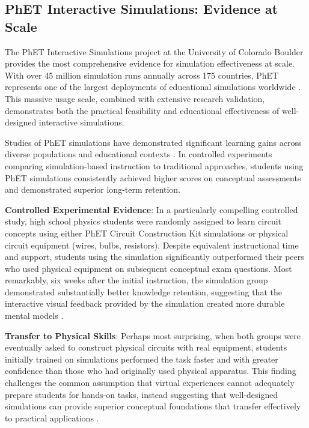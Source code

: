 \subsection{PhET Interactive Simulations: Evidence at Scale}

The PhET Interactive Simulations project at the University of Colorado Boulder provides the most comprehensive evidence for simulation effectiveness at scale. With over 45 million simulation runs annually across 175 countries, PhET represents one of the largest deployments of educational simulations worldwide \cite{phet2023}. This massive usage scale, combined with extensive research validation, demonstrates both the practical feasibility and educational effectiveness of well-designed interactive simulations.

Studies of PhET simulations have demonstrated significant learning gains across diverse populations and educational contexts \cite{adams2008study, finkelstein2005phet, perkins2006phet}. In controlled experiments comparing simulation-based instruction to traditional approaches, students using PhET simulations consistently achieved higher scores on conceptual assessments and demonstrated superior long-term retention.

\textbf{Controlled Experimental Evidence}: In a particularly compelling controlled study, high school physics students were randomly assigned to learn circuit concepts using either PhET Circuit Construction Kit simulations or physical circuit equipment (wires, bulbs, resistors). Despite equivalent instructional time and support, students using the simulation significantly outperformed their peers who used physical equipment on subsequent conceptual exam questions. Most remarkably, six weeks after the initial instruction, the simulation group demonstrated substantially better knowledge retention, suggesting that the interactive visual feedback provided by the simulation created more durable mental models \cite{finkelstein2005phet}.

\textbf{Transfer to Physical Skills}: Perhaps most surprising, when both groups were eventually asked to construct physical circuits with real equipment, students initially trained on simulations performed the task faster and with greater confidence than those who had originally used physical apparatus. This finding challenges the common assumption that virtual experiences cannot adequately prepare students for hands-on tasks, instead suggesting that well-designed simulations can provide superior conceptual foundations that transfer effectively to practical applications \cite{finkelstein2005phet}.

